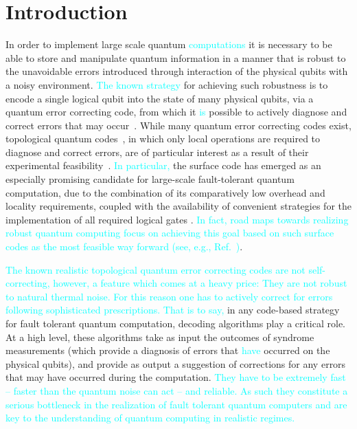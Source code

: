 \documentclass[twocolumn,preprintnumbers,amsmath,amssymb,notitlepage,nofootinbib,longbibliography,superscriptaddress,aps,pra,10pt]{revtex4-1}
\newcommand{\je}[1]{\textcolor{cyan}{#1}}
\begin{document}
\section{Introduction}\label{s:introduction}
	In order to implement large scale quantum \je{computations} it is necessary to be able to store and manipulate quantum information in a manner that is robust to the unavoidable errors introduced through interaction of the physical qubits with a noisy environment.
	\je{The known strategy} for achieving such robustness is to encode a single logical qubit into the state of many physical qubits, via a quantum error correcting code, from which it 
	\je{is} possible to actively diagnose and correct errors that may occur~\cite{Terhal15,Campbell17}.
	While many quantum error correcting codes exist, topological quantum codes~\cite{Kitaev03, Dennis02, Preskill17lectures, Nayak08, Pachos12, Terhal15, Brown16, Campbell17}, in which only local operations are required to diagnose and correct errors, are of particular interest as a result of their experimental feasibility~\cite{Reed12, Barends14, Nigg14, Corcoles15, Albrecht16, Takita16, Linke17}.
	\je{In particular,} the surface code has emerged as an especially promising candidate for large-scale fault-tolerant quantum computation, due to the combination of its comparatively low overhead and locality requirements, coupled with the availability of convenient strategies for the implementation of all required logical gates \cite{Fowler18,Litinski18b}. \je{In fact, road maps towards realizing robust quantum computing focus on achieving this goal based on such surface codes as the 
	most feasible way forward  (see, e.g., Ref.~\cite{Roadmap})}.

	\je{The known realistic topological quantum error correcting codes are not self-correcting, however, a feature which comes at a heavy price: They are not robust
	to natural thermal noise. For this reason one has to actively correct for errors following sophisticated prescriptions. That is to say,} in any code-based strategy for fault tolerant quantum computation, decoding algorithms play a critical role.
	At a high level, these algorithms take as input the outcomes of syndrome measurements (which provide a diagnosis of errors that \je{have} occurred on the physical qubits), and provide as output a suggestion of corrections for any errors that may have occurred during the computation. \je{They have to be extremely 
	fast -- faster than the quantum noise can act -- and reliable.
	As such they constitute a serious bottleneck in the realization of fault tolerant quantum computers and are key to the understanding of quantum
	computing in realistic regimes.}
\end{document}

